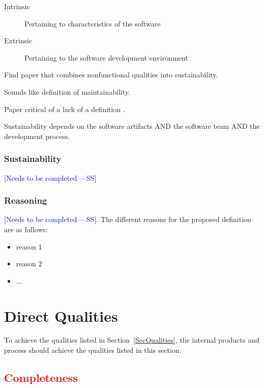 \documentclass[letterpaper, cleveref]{lipics-v2019}
\newcommand{\authornote}[3]{\textcolor{#1}{[#3 ---#2]}}
\newcommand{\authornote}[3]{}
\newcommand{\wss}[1]{\authornote{blue}{SS}{#1}} %
\newcommand{\ad}[1]{\authornote{cyan}{AD}{#1}} %
\newcommand{\notdone}[1]{\textcolor{red}{#1}}
\theoremstyle{definition}
\begin{document}
\begin{description}
\item[Intrinsic] Pertaining to characteristics of the software
\item[Extrinsic] Pertaining to the software development environment
\end{description}

Find paper that combines nonfunctional qualities into sustainability.

Sounds like definition of maintainability.

Paper critical of a lack of a definition \citep{VentersEtAl2014}.

Sustainability depends on the software artifacts AND the software team AND the
development process.

\begin{mybox}
\subsubsection*{Sustainability} 
\wss{Needs to be completed}
\end{mybox}

\subsubsection*{Reasoning}

\wss{Needs to be completed}.   The different reasons for the proposed definition
are as follows:

\begin{itemize}
  \item reason 1
  \item reason 2
  \item ...
\end{itemize}


\section{Direct Qualities} \label{SecDirectQs}

To achieve the  qualities listed in Section~\ref{SecQualities}, the internal
products and process should achieve the qualities listed in this section.


\subsection{\notdone{Completeness}} %
\end{document}
